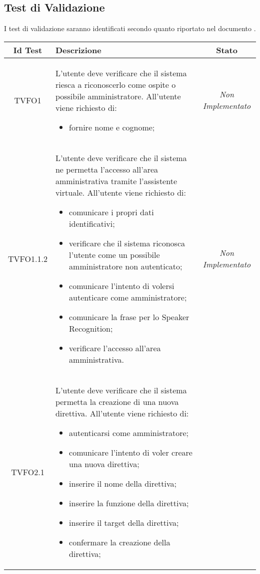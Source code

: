 \subsection{Test di Validazione}
I test di validazione saranno identificati secondo quanto riportato nel documento \NPdoc{}.
\normalsize
\begin{longtable}{|c|>{}m{8cm}|c|}

\hline

\textbf{Id Test} & \textbf{Descrizione} & \textbf{Stato}\\
\hline
\endhead
\hypertarget{TVFO1}{TVFO1} & L'utente deve verificare che il sistema riesca a riconoscerlo come ospite o possibile amministratore. All'utente viene richiesto di:
\begin{itemize}
\item fornire nome e cognome;
\end{itemize} & \textit{Non Implementato}\\ \hline
\hypertarget{TVFO1.1.2}{TVFO1.1.2} & L'utente deve verificare che il sistema ne permetta l'accesso all'area amministrativa tramite l'assistente virtuale. All'utente viene richiesto di:
\begin{itemize}
\item comunicare i propri dati identificativi;
\item verificare che il sistema riconosca l'utente come un possibile amministratore non autenticato;
\item comunicare l'intento di volersi autenticare come amministratore;
\item comunicare la frase per lo Speaker Recognition;
\item verificare l'accesso all'area amministrativa.
\end{itemize} & \textit{Non Implementato}\\ \hline
\hypertarget{TVFO2.1}{TVFO2.1} & L'utente deve verificare che il sistema permetta la creazione di una nuova direttiva. All'utente viene richiesto di:
\begin{itemize}
\item autenticarsi come amministratore;
\item comunicare l'intento di voler creare una nuova direttiva;
\item inserire il nome della direttiva;
\item inserire la funzione della direttiva;
\item inserire il target della direttiva;
\item confermare la creazione della direttiva;

\end{itemize}
\end{longtable}
